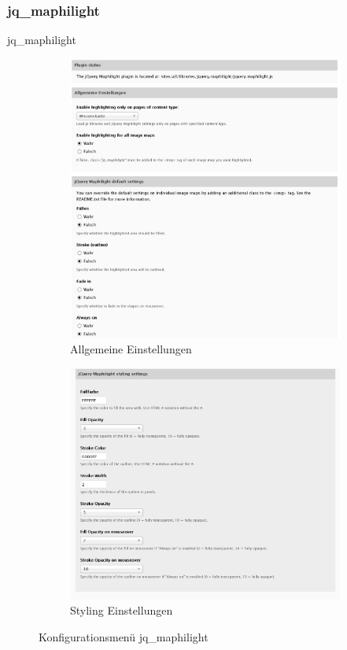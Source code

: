 \subsubsection{jq\_maphilight}\label{subsub:maphilight}
jq\_maphilight
\begin{figure}[H]
	\centering
	\begin{subfigure}[a]{0.4\textwidth}
		\centering
		\includegraphics[height=0.20\textheight]{images/config_maphilight1}
		\caption[]{Allgemeine Einstellungen}
		\label{fig:config_maphilight1}
	\end{subfigure}
	\begin{subfigure}[A]{0.4\textwidth}
		\centering
		\includegraphics[height=0.20\textheight]{images/config_maphilight2}
		\caption[]{Styling Einstellungen}
		\label{fig:config_maphilight2}
	\end{subfigure}
	\caption{Konfigurationsmenü jq\_maphilight}
	\label{fig:config_maphilight}
\end{figure}

